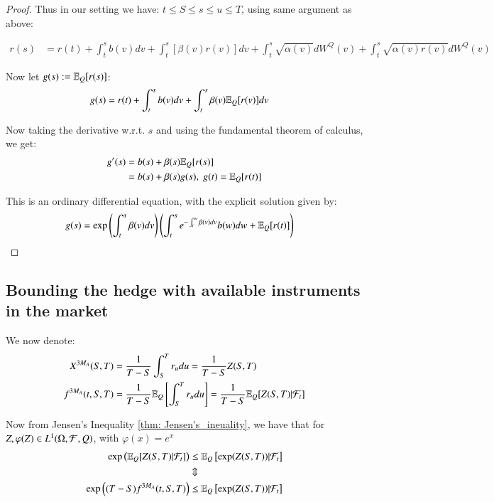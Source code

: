 \begin{proof}
Thus in our setting we have: $t\leq S \leq s \leq u \leq T$, using same argument as above: 

\begin{align*}
r(s) &= r(t) + \int_{t}^{s}b(v)dv + \int_{t}^{s}[\beta(v)r(v)]dv
+ \int_{t}^{s}\sqrt{\alpha(v)}dW^{Q}(v)
+ \int_{t}^{s}\sqrt{\alpha(v)r(v)}dW^{Q}(v)    
\end{align*}

Now let $g(s) := \mathbb{E}_{Q}[r(s)]$: 
\begin{align*}
g(s) &= r(t) + \int_{t}^{s}b(v)dv + \int_{t}^{s}\beta(v)\mathbb{E}_{Q}[r(v)]dv
\end{align*}

Now taking the derivative w.r.t. $s$ and using the fundamental theorem of calculus, we get: 
\begin{align*}
g'(s) &= b(s) + \beta(s)\mathbb{E}_{Q}[r(s)] \\ 
&= b(s) + \beta(s)g(s), \; g(t) = \mathbb{E}_{Q}[r(t)]
\end{align*}

This is an ordinary differential equation, with the explicit solution given by:
\begin{align*}
 g(s) &= \exp\left(
 \int_{t}^{s}\beta(v)dv
 \right)
 \left(
 \int_{t}^{s}e^{-\int_{t}^{w}\beta(v)dv}b(w)dw + \mathbb{E}_{Q}[r(t)]
 \right)
\end{align*}
\end{proof}


\subsection{Bounding the hedge with available instruments in the market}

We now denote: 
\begin{align*}
X^{3M_{A}}(S,T) &= \frac{1}{T-S}\int_{S}^{T}r_{u}du = \frac{1}{T-S}Z(S,T) \\ 
f^{3M_{A}}(t,S,T) &= \frac{1}{T-S}\mathbb{E}_{Q}\left[
\int_{S}^{T}r_{u}du
\right] = \frac{1}{T-S}\mathbb{E}_{Q}[Z(S,T)|\mathcal{F}_{t}]
\end{align*}

Now from Jensen's Inequality \ref{thm: Jensen's_ineuality}, we have that for $Z, \varphi(Z) \in L^{1}(\Omega, \mathcal{F}, Q)$, with $\varphi(x) = e^{x}$
\begin{align}
\label{eq: hedging_availible_inst_market_1}
\exp\left(
\mathbb{E}_{Q}[Z(S,T)|\mathcal{F}_{t}]
\right)
&\leq 
\mathbb{E}_{Q}\left[
\exp(Z(S,T))|\mathcal{F}_{t}
\right] \nonumber \\ 
&\Updownarrow \nonumber \\ 
\exp\left(
(T-S)f^{3M_{A}}(t,S,T)
\right) 
&\leq 
\mathbb{E}_{Q}\left[\exp(Z(S,T))|\mathcal{F}_{t}\right]
\end{align} 

